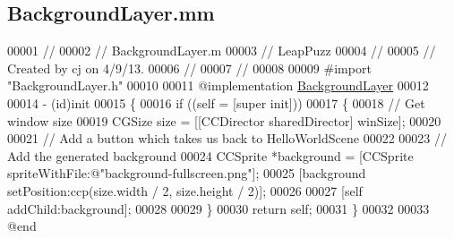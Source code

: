 \hypertarget{_background_layer_8mm}{\subsection{Background\-Layer.\-mm}
\label{db/d2a/_background_layer_8mm}
}

\begin{DoxyCode}
00001 \textcolor{comment}{//}
00002 \textcolor{comment}{//  BackgroundLayer.m}
00003 \textcolor{comment}{//  LeapPuzz}
00004 \textcolor{comment}{//}
00005 \textcolor{comment}{//  Created by cj on 4/9/13.}
00006 \textcolor{comment}{//}
00007 \textcolor{comment}{//}
00008 
00009 \textcolor{preprocessor}{#import "BackgroundLayer.h"}
00010 
00011 \textcolor{keyword}{@implementation }\hyperlink{interface_background_layer}{BackgroundLayer}
00012 
00014 - (id)init
00015 \{
00016     \textcolor{keywordflow}{if} ((\textcolor{keyword}{self} = [super init]))
00017     \{
00018         \textcolor{comment}{// Get window size}
00019         CGSize size = [[CCDirector sharedDirector] winSize];
00020         
00021         \textcolor{comment}{// Add a button which takes us back to HelloWorldScene}
00022         
00023         \textcolor{comment}{// Add the generated background}
00024         CCSprite *background = [CCSprite spriteWithFile:@"background-fullscreen.png"];
00025         [background setPosition:ccp(size.width / 2, size.height / 2)];
00026 
00027         [\textcolor{keyword}{self} addChild:background];
00028 
00029     \}
00030     \textcolor{keywordflow}{return} \textcolor{keyword}{self};
00031 \}
00032 
00033 \textcolor{keyword}{@end}
\end{DoxyCode}
